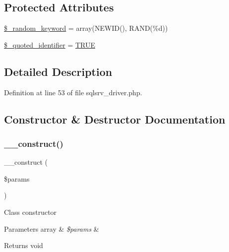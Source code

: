 \subsection*{Protected Attributes}
\begin{DoxyCompactItemize}
\item 
\mbox{\hyperlink{class_c_i___d_b__sqlsrv__driver_a10213aa6e05f6d924d3277bb1d2fea00}{\$\+\_\+random\+\_\+keyword}} = array(\textquotesingle{}N\+E\+W\+ID()\textquotesingle{}, \textquotesingle{}R\+A\+ND(\%d)\textquotesingle{})
\item 
\mbox{\hyperlink{class_c_i___d_b__sqlsrv__driver_a1dae2f0e9ad7299438a9976d6cdbf2ad}{\$\+\_\+quoted\+\_\+identifier}} = \mbox{\hyperlink{constants_8php_ae04a3efe6aa42044f803ee90c2277846}{T\+R\+UE}}
\end{DoxyCompactItemize}


\subsection{Detailed Description}


Definition at line 53 of file sqlsrv\+\_\+driver.\+php.



\subsection{Constructor \& Destructor Documentation}
\mbox{\label{class_c_i___d_b__sqlsrv__driver_a9162320adff1a1a4afd7f2372f753a3e}} 
\subsubsection{\texorpdfstring{\_\_construct()}{\_\_construct()}}
{\footnotesize\ttfamily \+\_\+\+\_\+construct (\begin{DoxyParamCaption}\item[{}]{\$params }\end{DoxyParamCaption})}

Class constructor


\begin{DoxyParams}[1]{Parameters}
array & {\em \$params} & \\
\hline
\end{DoxyParams}
\begin{DoxyReturn}{Returns}
void 
\end{DoxyReturn}



